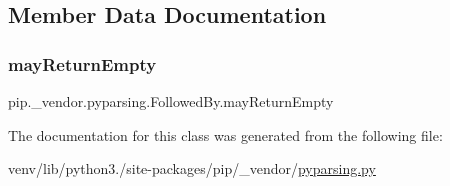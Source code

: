 \subsection{Member Data Documentation}
\mbox{\label{classpip_1_1__vendor_1_1pyparsing_1_1FollowedBy_a202b4cdaafda86bb1046f1d317aa7e0a}} 
\subsubsection{\texorpdfstring{may\+Return\+Empty}{mayReturnEmpty}}
{\footnotesize\ttfamily pip.\+\_\+vendor.\+pyparsing.\+Followed\+By.\+may\+Return\+Empty}



The documentation for this class was generated from the following file\+:\begin{DoxyCompactItemize}
\item 
venv/lib/python3./site-\/packages/pip/\+\_\+vendor/\hyperlink{pip_2__vendor_2pyparsing_8py}{pyparsing.\+py}\end{DoxyCompactItemize}
